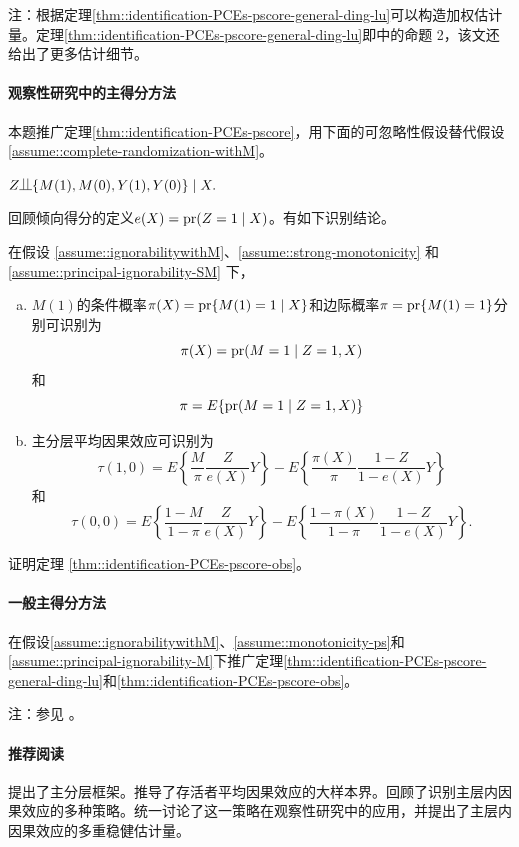 注：根据定理\ref{thm::identification-PCEs-pscore-general-ding-lu}可以构造加权估计量。定理\ref{thm::identification-PCEs-pscore-general-ding-lu}即\citet{ding2017principal}中的命题 2，该文还给出了更多估计细节。 



\paragraph{观察性研究中的主得分方法}
\label{hw::principalscore-observational}

本题推广定理\ref{thm::identification-PCEs-pscore}，用下面的可忽略性假设替代假设\ref{assume::complete-randomization-withM}。


\begin{assumption}
\label{assume::ignorabilitywithM}
$
Z\ind \{ M(1), M(0), Y(1) , Y(0) \} \mid X.
$
\end{assumption}

回顾倾向得分的定义$e(X) = \textup{pr}(Z=1\mid X)$。有如下识别结论。 


\begin{theorem}
\label{thm::identification-PCEs-pscore-obs}
在假设 \ref{assume::ignorabilitywithM}、\ref{assume::strong-monotonicity} 和 \ref{assume::principal-ignorability-SM} 下， 
\begin{enumerate}
[(a)]
\item 
$M(1)$的条件概率$\pi(X) =  \textup{pr}\{ M(1)=1\mid X \}  $和边际概率$\pi =  \textup{pr}\{ M(1)=1\} $分别可识别为
$$
\pi(X)   =  \textup{pr}(M=1\mid Z=1, X ) 
$$
和
$$
\pi  =  E\{\textup{pr}(M=1\mid Z=1, X ) \}
$$ 
\item
主分层平均因果效应可识别为
$$
\tau(1,0) = E\left\{   \frac{M}{\pi}   \frac{Z}{e(X)} Y \right\}
- E\left\{   \frac{ \pi(X)  }{\pi}   \frac{1-Z}{1-e(X)} Y    \right\} 
$$
和
$$
\tau(0,0) = E\left\{   \frac{1-M}{1-\pi}   \frac{Z}{e(X)} Y \right\}
- E\left\{   \frac{ 1- \pi(X)  }{1 - \pi}   \frac{1-Z}{1-e(X)} Y    \right\} .
$$
\end{enumerate}
\end{theorem}


证明定理 \ref{thm::identification-PCEs-pscore-obs}。 


 


\paragraph{一般主得分方法}
\label{hw::general-principal-score-jiangetal}

在假设\ref{assume::ignorabilitywithM}、\ref{assume::monotonicity-ps}和\ref{assume::principal-ignorability-M}下推广定理\ref{thm::identification-PCEs-pscore-general-ding-lu}和\ref{thm::identification-PCEs-pscore-obs}。 


注：参见 \citet{jiang2020multiply}。 


\paragraph{推荐阅读}

\citet{frangakis2002principal}提出了主分层框架。\citet{zhang2003estimation}推导了存活者平均因果效应的大样本界。\citet{jiang2020identification}回顾了识别主层内因果效应的多种策略。\citet{jiang2020multiply}统一讨论了这一策略在观察性研究中的应用，并提出了主层内因果效应的多重稳健估计量。  
 
